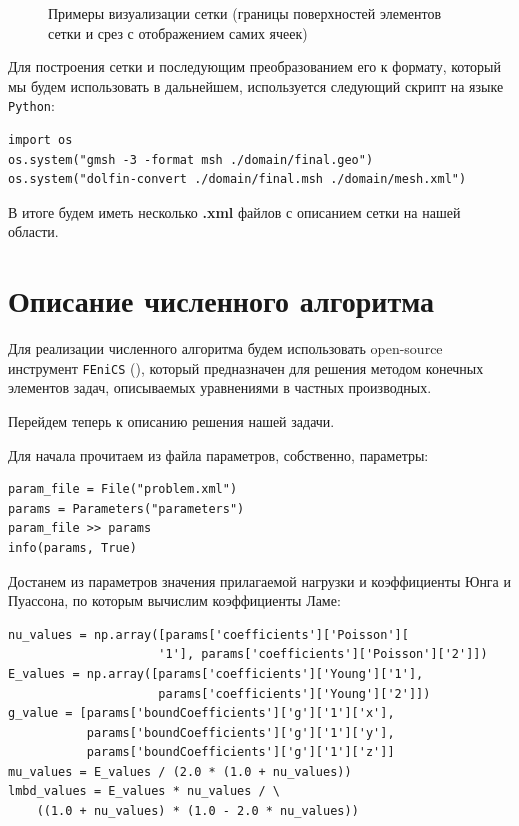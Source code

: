 \documentclass[a4paper, 14pt]{extreport}
\begin{document}
\begin{figure}[H]
\begin{subfigure}[h]{0.5\textwidth}
	\end{subfigure}
	\caption{Примеры визуализации сетки (границы поверхностей элементов сетки и срез с отображением самих ячеек)}
	\label{fig: mesh_display}
\end{figure}

Для построения сетки и последующим преобразованием его к формату, который 
мы будем использовать в дальнейшем, используется следующий скрипт на языке \texttt{Python}:

\begin{lstlisting}
import os
os.system("gmsh -3 -format msh ./domain/final.geo")
os.system("dolfin-convert ./domain/final.msh ./domain/mesh.xml")
\end{lstlisting}

В итоге будем иметь несколько \textbf{.xml} файлов с описанием
сетки на нашей области.

\section{Описание численного алгоритма}

Для реализации численного алгоритма будем использовать open-source
инструмент \texttt{FEniCS} (\cite{fenics_book}), который предназначен для решения методом
конечных элементов задач, описываемых уравнениями в частных производных. 

Перейдем теперь к описанию решения нашей задачи.

Для начала прочитаем из файла параметров, собственно, параметры:
\begin{lstlisting}
param_file = File("problem.xml")
params = Parameters("parameters")
param_file >> params
info(params, True)
\end{lstlisting}

Достанем из параметров значения прилагаемой нагрузки и
коэффициенты Юнга и Пуассона, по которым вычислим коэффициенты Ламе:
\begin{lstlisting}
nu_values = np.array([params['coefficients']['Poisson'][
                     '1'], params['coefficients']['Poisson']['2']])
E_values = np.array([params['coefficients']['Young']['1'],
                     params['coefficients']['Young']['2']])
g_value = [params['boundCoefficients']['g']['1']['x'],
           params['boundCoefficients']['g']['1']['y'],
           params['boundCoefficients']['g']['1']['z']]
mu_values = E_values / (2.0 * (1.0 + nu_values))
lmbd_values = E_values * nu_values / \
    ((1.0 + nu_values) * (1.0 - 2.0 * nu_values))
\end{lstlisting}
\end{document}
